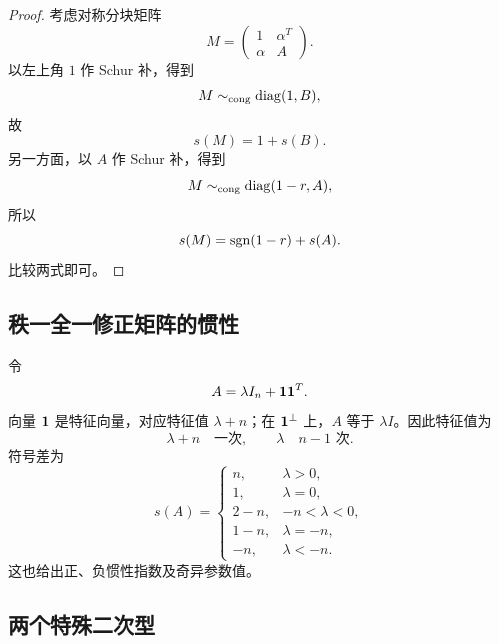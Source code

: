 \begin{proof}
考虑对称分块矩阵
\begin{equation}
 M=\begin{pmatrix}1&\alpha^T\\\alpha&A\end{pmatrix}.
\end{equation}
以左上角 $1$ 作 Schur 补，得到
\begin{equation}
 M\sim_{\mathrm{cong}}\operatorname{diag}(1,B),
\end{equation}
故
\begin{equation}
 s(M)=1+s(B).
\end{equation}
另一方面，以 $A$ 作 Schur 补，得到
\begin{equation}
 M\sim_{\mathrm{cong}}\operatorname{diag}(1-r,A),
\end{equation}
所以
\begin{equation}
 s(M)=\operatorname{sgn}(1-r)+s(A).
\end{equation}
比较两式即可。
\end{proof}

\subsection{秩一全一修正矩阵的惯性}

令
\begin{equation}
 A=\lambda I_n+\bm 1\bm 1^T.
\end{equation}
向量 $\bm 1$ 是特征向量，对应特征值 $\lambda+n$；在 $\bm 1^\perp$ 上，$A$ 等于 $\lambda I$。因此特征值为
\begin{equation}
 \lambda+n\quad\text{一次},
 \qquad
 \lambda\quad\text{$n-1$ 次}.
\end{equation}
符号差为
\begin{equation}
 s(A)=
 \begin{cases}
 n,&\lambda>0,\\
 1,&\lambda=0,\\
 2-n,&-n<\lambda<0,\\
 1-n,&\lambda=-n,\\
 -n,&\lambda<-n.
 \end{cases}
\end{equation}
这也给出正、负惯性指数及奇异参数值。

\subsection{两个特殊二次型}

